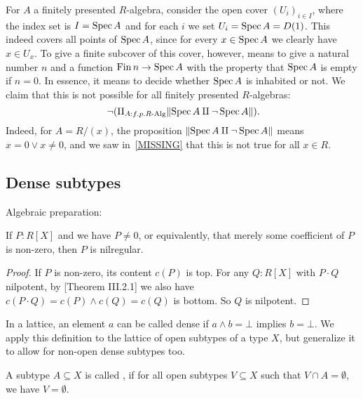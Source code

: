 \begin{example}
  For $A$ a finitely presented $R$-algebra,
  consider the open cover ${(U_i)}_{i \in I}$,
  where the index set is $I = \operatorname{Spec} A$
  and for each $i$ we set $U_i = \operatorname{Spec} A = D(1)$.
  This indeed covers all points of $\operatorname{Spec} A$,
  since for every $x \in \operatorname{Spec} A$ we clearly have $x \in U_x$.
  To give a finite subcover of this cover, however,
  means to give a natural number $n$ and a function $\operatorname{Fin} n \to \operatorname{Spec} A$
  with the property that $\operatorname{Spec} A$ is empty if $n = 0$.
  In essence, it means to decide whether $\operatorname{Spec} A$ is inhabited or not.
  We claim that this is not possible for all finitely presented $R$-algebras:
  \[ \lnot (\Pi_{A : f.p. R\text{-Alg}} \propTrunc{\Spec A \amalg \lnot \Spec A} )
     \rlap{.} \]
  Indeed, for $A = R/(x)$,
  the proposition $\lVert \operatorname{Spec} A \amalg \lnot \operatorname{Spec} A \rVert$
  means $x = 0 \lor x \neq 0$,
  and we saw in~\ref{MISSING} that this is not true for all $x \in R$.
\end{example}

\subsection{Dense subtypes}

Algebraic preparation:

\begin{lemma}%
  \label{nilregular-non-zero-polynomial}
  If $P:R[X]$ and we have $P\neq 0$, or equivalently,
  that merely some coefficient of $P$ is non-zero,
  then $P$ is nilregular.
\end{lemma}

\begin{proof}
  If $P$ is non-zero, its content $c(P)$ is top.
  For any $Q:R[X]$ with $P\cdot Q$ nilpotent,
  by \cite{lombardi-quitte}[Theorem III.2.1] we also have $c(P\cdot Q)=c(P)\wedge c(Q)=c(Q)$ is bottom.
  So $Q$ is nilpotent.
\end{proof}

In a lattice,
an element $a$ can be called dense
if $a \wedge b = \bot$ implies $b = \bot$.
We apply this definition to the lattice of open subtypes of a type $X$,
but generalize it to allow for non-open dense subtypes too.

\begin{definition}
  A subtype $A\subseteq X$ is called ,
  if for all open subtypes $V\subseteq X$ such that $V\cap A=\emptyset$, we have $V=\emptyset$.
\end{definition}

